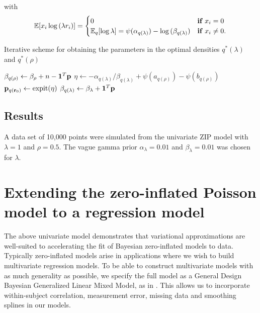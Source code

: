 \documentclass{article}[12pt]
\begin{document}
\noindent with 
$$
{\mathbb E} [x_i \log{(\lambda r_i)}]  =
	\begin{cases}
	0 & \textbf{if } x_i = 0 \\
	{\mathbb E}_q [\log \lambda] = \psi(\alpha_{q(\lambda)}) - \log{(\beta_{q(\lambda)})} & \textbf{if } x_i \ne 0. \\
	\end{cases}
$$

\begin{algorithm} 
\caption[Algorithm 1]{Iterative scheme for obtaining the parameters in the
optimal densities $q^*(\lambda)$ and $q^*(\rho)$}
\begin{algorithmic}
\STATE $\beta_{q(\rho)} \leftarrow \beta_\rho + n - {\bf 1}^T{\bf p}$
\STATE $\eta \leftarrow -\alpha_{q(\lambda)}/\beta_{q(\lambda)} + \psi{(a_{q{(\rho)}})} - \psi{(b_{q{(\rho)}})}$
\STATE ${\bf p}_{q({\bf r}_0)} \leftarrow \text{expit} (\eta)$
\STATE $\beta_{q(\lambda)} \leftarrow \beta_\lambda + {\bf 1}^T{\bf p}$
\ENDWHILE
\end{algorithmic}
\label{algorithm1}
\end{algorithm}


\subsection{Results}
A data set of 10,000 points were simulated from the univariate ZIP model with
$\lambda = 1$ and $\rho = 0.5$. The vague gamma prior $\alpha_\lambda = 0.01$ and $\beta_\lambda = 0.01$ was chosen for $\lambda$.

\section{Extending the zero-inflated Poisson model to a regression model}
\noindent The above univariate model demonstrates that variational approximations are well-suited
to accelerating the fit of Bayesian zero-inflated models to data. Typically zero-inflated
models arise in applications where we wish to build multivariate regression models. To be able to
construct multivariate models with as much generality as possible, we specify the full
model as a General Design Bayesian Generalized Linear Mixed Model, as in \citep{zhao06}.
This allows us to incorporate within-subject correlation, measurement error, missing data
and smoothing splines in our models.
\end{document}

